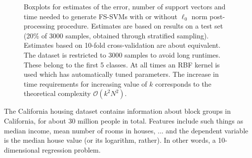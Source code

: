 \begin{figure}[!htb]
\begin{minipage}{\textwidth}
	\hfil
	\hfil
	\caption*{$k=8$}
\end{minipage}
\caption{Boxplots for estimates of the error, number of support vectors and time needed to generate FS-SVMs with or without $\ell_0$ norm post-processing procedure. Estimates are based on results on a test set (20\% of 3000 samples, obtained through stratified sampling). Estimates based on 10-fold cross-validation are about equivalent. The dataset is restricted to 3000 samples to avoid long runtimes. These belong to the first 5 classes. At all times an RBF kernel is used which has automatically tuned parameters. The increase in time requirements for increasing value of $k$ corresponds to the theoretical complexity $\mathcal{O}(k^2N^2)$.}
\label{shuttleestimates}
\end{figure}


The California housing dataset contains information about block groups in California, for about 30 million people in total. Features include such things as median income, mean number of rooms in houses, ... and the dependent variable is the median house value (or its logarithm, rather). In other words, a 10-dimensional regression problem. 
